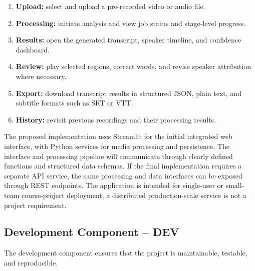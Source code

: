 \documentclass[11pt,a4paper]{article}
\begin{document}
\begin{enumerate}
  \item \textbf{Upload:} select and upload a pre-recorded video or audio file.
  \item \textbf{Processing:} initiate analysis and view job status and
  stage-level progress.
  \item \textbf{Results:} open the generated transcript, speaker timeline,
  and confidence dashboard.
  \item \textbf{Review:} play selected regions, correct words, and revise
  speaker attribution where necessary.
  \item \textbf{Export:} download transcript results in structured JSON,
  plain text, and subtitle formats such as SRT or VTT.
  \item \textbf{History:} revisit previous recordings and their processing
  results.
\end{enumerate}

The proposed implementation uses Streamlit for the initial integrated
web interface, with Python services for media processing and persistence.
The interface and processing pipeline will communicate through clearly
defined functions and structured data schemas. If the final implementation
requires a separate API service, the same processing and data interfaces
can be exposed through REST endpoints. The application is intended for
single-user or small-team course-project deployment; a distributed
production-scale service is not a project requirement.

\subsection{Development Component -- DEV}

The development component ensures that the project is maintainable,
testable, and reproducible.
\end{document}
